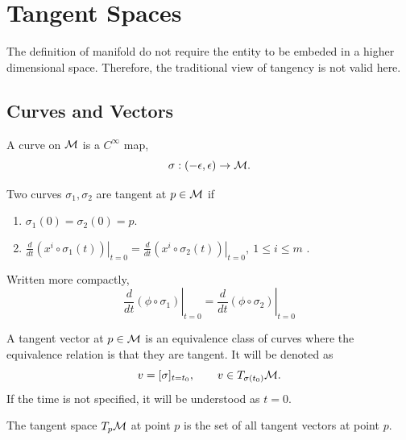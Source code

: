 \documentclass[../main.tex]{subfiles}
\begin{document}
    \section{Tangent Spaces}
    \begin{remark}
        The definition of manifold do not require the entity to be embeded in 
        a higher dimensional space. Therefore, the traditional view of tangency 
        is not valid here.
        
    \end{remark}

    \subsection{Curves and Vectors}
    \begin{definition}[Curve]\label{def:curve}
        A curve on \(\manifold[M]\) is a \(C^\infty\) map,
        \[
        \sigma : (-\epsilon, \epsilon) \to \manifold[M].
        \]
    \end{definition}
    \begin{definition}\label{def:curve-tangency}
        Two curves \(\sigma_1, \sigma_2\) are tangent at \(p \in \manifold[M]\) 
        if 
        \begin{enumerate}
            \item \(\sigma_1(0)=\sigma_2(0)=p\).
            \item \(\left.\frac{d}{dt}(x^i \circ \sigma_1(t))\right|_{t=0}
             = \left.\frac{d}{dt}(x^i \circ \sigma_2(t))\right|_{t=0},~1 \leq 
             i \leq m\) .
        \end{enumerate}
    \end{definition}
    \begin{remark}
        Written more compactly, 
        \[
        \left.\frac{d}{dt}(\phi\circ\sigma_1)\right|_{t=0}
        =\left.\frac{d}{dt}(\phi\circ\sigma_2)\right|_{t=0}
        \]
        
    \end{remark}
    \newpage
    \begin{definition}\label{def:tangent-vector-curve}
        A tangent vector at \(p \in \manifold[M]\) is an equivalence
        class of curves where the equivalence relation is that they are
        tangent. It will be denoted as 
        \[
            v = [\sigma]_{t=t_0}, \qquad v \in T_{\sigma(t_0)}
            \manifold[M].
        \]
        If the time is not specified, it will be understood as \(t=0\).
    \end{definition}
    \begin{definition}\label{def:tangent-space-curve}
        The tangent space \(T_p\manifold[M]\) at point \(p\) is the set of all 
        tangent vectors at point \(p\).
    \end{definition}
    
\end{document}
